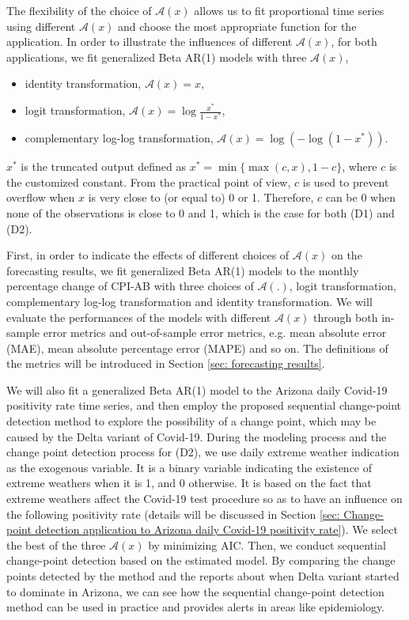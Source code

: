 \documentclass{article}
\theoremstyle{definition}
\begin{document}
The flexibility of the choice of $\mathcal{A}(x)$ allows us to fit proportional time series using different $\mathcal{A}(x)$ and choose the most appropriate function for the application. In order to illustrate the influences of different $\mathcal{A}(x)$, for both applications, we fit generalized Beta AR(1) models with three $\mathcal{A}(x)$, 
\begin{itemize}
    \item identity transformation, $\mathcal{A}(x) = x$,
    \item logit transformation, $\mathcal{A}(x) = \log \frac{x^*}{1-x^*}$,
     \item complementary log-log transformation, $\mathcal{A}(x) = \log(-\log(1-x^*))$.
\end{itemize}
$x^*$ is the truncated output defined as $x^* = \min\{\max(c,x),1-c\}$, where $c$ is the customized constant. From the practical point of view, $c$ is used to prevent overflow when $x$ is very close to (or equal to) 0 or 1. Therefore, $c$ can be 0 when none of the observations is close to 0 and 1, which is the case for both (D1) and (D2).

First, in order to indicate the effects of different choices of $\mathcal{A}(x)$ on the forecasting results, we fit generalized Beta AR(1) models to the monthly percentage change of CPI-AB with three choices of $\mathcal{A}(.)$, logit transformation, complementary log-log transformation and identity transformation. We will evaluate the performances of the models with different $\mathcal{A}(x)$ through both in-sample error metrics and out-of-sample error metrics, e.g. mean absolute error (MAE), mean absolute percentage error (MAPE) and so on. The definitions of the metrics will be introduced in Section \ref{sec: forecasting results}.

We will also fit a generalized Beta AR(1) model to the Arizona daily Covid-19 positivity rate time series, and then employ the proposed sequential change-point detection method to explore the possibility of a change point, which may be caused by the Delta variant of Covid-19. During the modeling process and the change point detection process for (D2), we use daily extreme weather indication as the exogenous variable. It is a binary variable indicating the existence of extreme weathers when it is 1, and 0 otherwise. It is based on the fact that extreme weathers affect the Covid-19 test procedure so as to have an influence on the following positivity rate (details will be discussed in Section \ref{sec: Change-point detection application to Arizona daily Covid-19 positivity rate}). We select the best of the three $\mathcal{A}(x)$ by minimizing AIC. Then, we conduct sequential change-point detection based on the estimated model. By comparing the change points detected by the method and the reports about when Delta variant started to dominate in Arizona, we can see how the sequential change-point detection method can be used in practice and provides alerts in areas like epidemiology.
\end{document}
